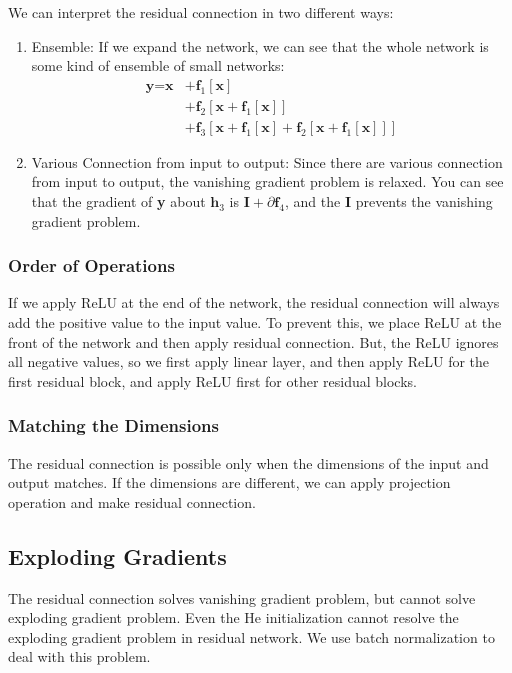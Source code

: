 \documentclass{article}
\begin{document}
        We can interpret the residual connection in two different ways:
        \begin{enumerate}
            \item Ensemble: If we expand the network, we can see that the whole network is some kind of ensemble of 
                small networks:
                \begin{align}
                \textbf{y} = \textbf{x} &+ \textbf{f}_1[\textbf{x}] \\
                &+\textbf{f}_2[\textbf{x} + \textbf{f}_1[\textbf{x}]] \\
                &+\textbf{f}_3[\textbf{x} + \textbf{f}_1[\textbf{x}] + \textbf{f}_2[\textbf{x} + \textbf{f}_1[\textbf{x}]]]
                \end{align}
            \item Various Connection from input to output:
                Since there are various connection from input to output,
                the vanishing gradient problem is relaxed.
                You can see that the gradient of \textbf{y} about $\textbf{h}_3$ is $\textbf{I} + \partial\textbf{f}_4$,
                and the $\textbf{I}$ prevents the vanishing gradient problem. 
        \end{enumerate}

        \subsubsection{Order of Operations}
            If we apply ReLU at the end of the network, the residual connection will always add the positive value to the input value.
            To prevent this, we place ReLU at the front of the network and then apply residual connection.
            But, the ReLU ignores all negative values, so we first apply linear layer, and then apply ReLU for the
            first residual block, and apply ReLU first for other residual blocks.

        \subsubsection{Matching the Dimensions}
            The residual connection is possible only when the dimensions of the input and output matches.
            If the dimensions are different, we can apply projection operation and make residual connection.
        
    \subsection{Exploding Gradients}
        The residual connection solves vanishing gradient problem, but cannot solve exploding gradient problem.
        Even the He initialization cannot resolve the exploding gradient problem in residual network.
        We use batch normalization to deal with this problem.
\end{document}

